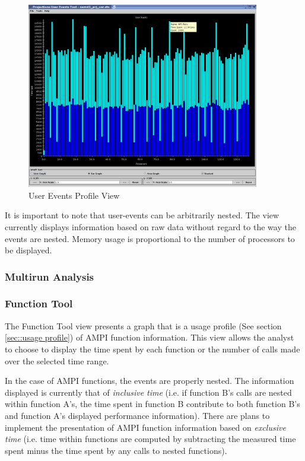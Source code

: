 \documentclass[10pt]{article}
\begin{document}
\begin{figure}[htb]
\center
\includegraphics[width=4.0in]{fig/apoa1_128_userEventsView}
\caption{User Events Profile View}
\label{user event profile}
\end{figure}

It is important to note that user-events can be arbitrarily
nested. The view currently displays information based on raw data
without regard to the way the events are nested. Memory usage is
proportional to the number of processors to be displayed.



\subsubsection{Multirun Analysis}

\subsubsection{Function Tool}
\label{sec::function tool}
The Function Tool view presents a graph that is a usage profile (See
section \ref{sec::usage profile}) of AMPI function information. This
view allows the analyst to choose to display the time spent by each
function or the number of calls made over the selected time range.

In the case of AMPI functions, the events are properly nested. The
information displayed is currently that of {\em inclusive time}
(i.e. if function B's calls are nested within function A's, the time
spent in function B contribute to both function B's and function A's
displayed performance information). There are plans to implement the
presentation of AMPI function information based on {\em exclusive
time} (i.e. time within functions are computed by subtracting the
measured time spent minus the time spent by any calls to nested
functions).
\end{document}
